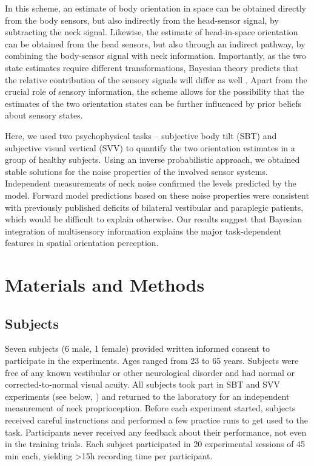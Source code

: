 In this scheme, an estimate of body orientation in space can be obtained directly from the body sensors, but also indirectly from the head-sensor signal, by subtracting the neck signal. Likewise, the estimate of head-in-space orientation can be obtained from the head sensors, but also through an indirect pathway, by combining the body-sensor signal with neck information. Importantly, as the two state estimates require different transformations, Bayesian theory predicts that the relative contribution of the sensory signals will differ as well \cite{mcguire2009}. Apart from the crucial role of sensory information, the scheme allows for the possibility that the estimates of the two orientation states can be further influenced by prior beliefs about sensory states.

Here, we used two psychophysical tasks -- subjective body tilt (SBT) and subjective visual vertical (SVV) to quantify the two orientation estimates in a group of healthy subjects. Using an inverse probabilistic approach, we obtained stable solutions for the noise properties of the involved sensor systems. Independent measurements of neck noise confirmed the levels predicted by the model. Forward model predictions based on these noise properties were consistent with previously published deficits of bilateral vestibular and paraplegic patients, which would be difficult to explain otherwise. Our results suggest that Bayesian integration of multisensory information explains the major task-dependent features in spatial orientation perception.



\section{Materials and Methods}
\label{p1:sec:methods}

\subsection{Subjects}

Seven subjects (6 male, 1 female) provided written informed consent to participate in the experiments. Ages ranged from 23 to 65 years. Subjects were free of any known vestibular or other neurological disorder and had normal or corrected-to-normal visual acuity. All subjects took part in SBT and SVV experiments (see below, ) and returned to the laboratory for an independent measurement of neck proprioception. Before each experiment started, subjects received careful instructions and performed a few practice runs to get used to the task. Participants never received any feedback about their performance, not even in the training trials. Each subject participated in 20 experimental sessions of {\textapprox}45 min each, yielding {\textgreater}15h recording time per participant.

